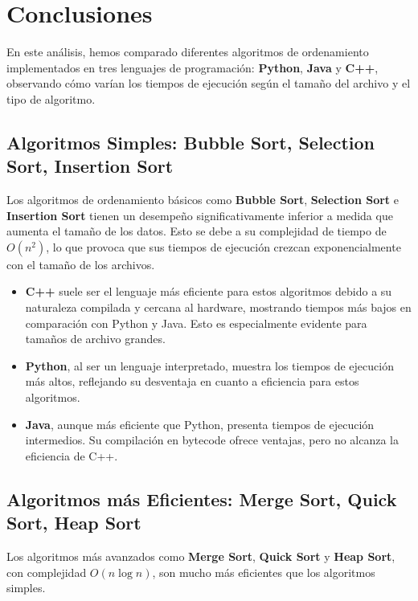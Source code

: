\newpage
\section{Conclusiones}

En este análisis, hemos comparado diferentes algoritmos de ordenamiento implementados en tres lenguajes de programación: \textbf{Python}, \textbf{Java} y \textbf{C++}, observando cómo varían los tiempos de ejecución según el tamaño del archivo y el tipo de algoritmo.

\subsection{Algoritmos Simples: Bubble Sort, Selection Sort, Insertion Sort}
Los algoritmos de ordenamiento básicos como \textbf{Bubble Sort}, \textbf{Selection Sort} e \textbf{Insertion Sort} tienen un desempeño significativamente inferior a medida que aumenta el tamaño de los datos. Esto se debe a su complejidad de tiempo de \(O(n^2)\), lo que provoca que sus tiempos de ejecución crezcan exponencialmente con el tamaño de los archivos.

\begin{itemize}
    \item \textbf{C++} suele ser el lenguaje más eficiente para estos algoritmos debido a su naturaleza compilada y cercana al hardware, mostrando tiempos más bajos en comparación con Python y Java. Esto es especialmente evidente para tamaños de archivo grandes.
    
    \item \textbf{Python}, al ser un lenguaje interpretado, muestra los tiempos de ejecución más altos, reflejando su desventaja en cuanto a eficiencia para estos algoritmos.
    
    \item \textbf{Java}, aunque más eficiente que Python, presenta tiempos de ejecución intermedios. Su compilación en bytecode ofrece ventajas, pero no alcanza la eficiencia de C++.
\end{itemize}

\subsection{Algoritmos más Eficientes: Merge Sort, Quick Sort, Heap Sort}
Los algoritmos más avanzados como \textbf{Merge Sort}, \textbf{Quick Sort} y \textbf{Heap Sort}, con complejidad \(O(n \log n)\), son mucho más eficientes que los algoritmos simples.

